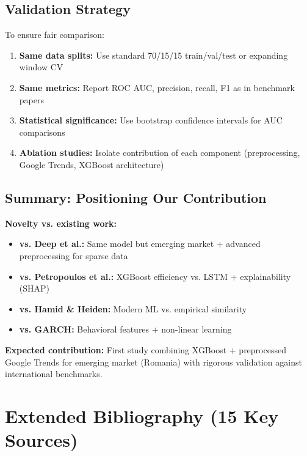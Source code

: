 \documentclass[12pt,a4paper]{article}
\begin{document}
\subsection{Validation Strategy}

To ensure fair comparison:

\begin{enumerate}
    \item \textbf{Same data splits:} Use standard 70/15/15 train/val/test or expanding window CV
    
    \item \textbf{Same metrics:} Report ROC AUC, precision, recall, F1 as in benchmark papers
    
    \item \textbf{Statistical significance:} Use bootstrap confidence intervals for AUC comparisons
    
    \item \textbf{Ablation studies:} Isolate contribution of each component (preprocessing, Google Trends, XGBoost architecture)
\end{enumerate}

\subsection{Summary: Positioning Our Contribution}

\textbf{Novelty vs. existing work:}

\begin{itemize}
    \item \textbf{vs. Deep et al.:} Same model but emerging market + advanced preprocessing for sparse data
    \item \textbf{vs. Petropoulos et al.:} XGBoost efficiency vs. LSTM + explainability (SHAP)
    \item \textbf{vs. Hamid \& Heiden:} Modern ML vs. empirical similarity
    \item \textbf{vs. GARCH:} Behavioral features + non-linear learning
\end{itemize}

\textbf{Expected contribution:} First study combining XGBoost + preprocessed Google Trends for emerging market (Romania) with rigorous validation against international benchmarks.

\newpage
\section{Extended Bibliography (15 Key Sources)}
\end{document}
